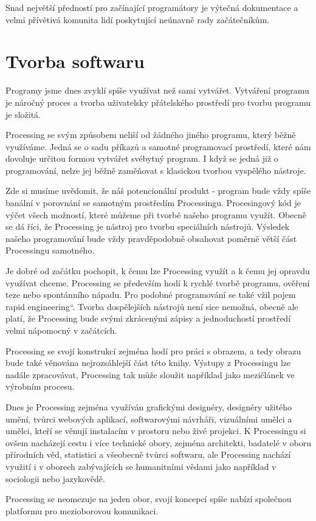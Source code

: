\documentclass[10pt]{book}
\renewcommand\uv[1]{\quotedblbase #1\textquotedblleft}%
\newcommand{\oddil}[1]{\section{#1}\index{#1}\label{#1}}
\begin{document}
Snad největší předností pro začínající programátory je výtečná dokumentace a velmi přívětivá komunita lidí poskytující neúnavně rady začátečníkům.


\oddil{Tvorba softwaru}

Programy jsme dnes zvyklí spíše využívat než sami vytvářet. Vytváření programu je náročný proces a tvorba uživatelsky přátelského prostředí pro tvorbu programu je složitá.

Processing se svým způsobem neliší od žádného jiného programu, který běžně využíváme. Jedná se o sadu příkazů a samotné programovací prostředí, které nám dovoluje určitou formou vytvářet svébytný program. I když se jedná již o programování, nelze jej běžně zaměňovat s klasickou tvorbou vyspělého nástroje.

Zde si musíme uvědomit, že náš potencionální produkt - program bude vždy spíše banální v porovnání se samotným prostředím Processingu. Procesingový kód je výčet všech možností, které můžeme při tvorbě našeho programu využít. Obecně se dá říci, že Processing je nástroj pro tvorbu speciálních nástrojů. Výsledek našeho programování bude vždy pravděpodobně obsahovat poměrně větší část Processingu samotného.

Je dobré od začátku pochopit, k čemu lze Processing využít a k čemu jej opravdu využívat chceme. Processing se především hodí k rychlé tvorbě programu, ověření teze nebo spontánního nápadu. Pro podobné programování se také vžil pojem \uv{rapid engineering}. Tvorba dospělejších nástrojů není sice nemožná, obecně ale platí, že Processing bude svými zkrácenými zápisy a jednoduchostí prostředí velmi nápomocný v začátcích. 

Processing se svojí konstrukcí zejména hodí pro práci s obrazem, a tedy obrazu bude také věnována nejrozsáhlejší část této knihy. Výstupy z Processingu lze nadále zpracovávat, Processing tak může sloužit například jako mezičlánek ve výrobním procesu.

Dnes je Processing zejména využíván grafickými designéry, designéry užitého umění, tvůrci webových aplikací, softwarovými návrháři, vizuálními umělci a umělci, kteří se věnují instalacím v prostoru nebo živé projekci. K Processingu si ovšem nacházejí cestu i více technické obory, zejména architekti, badatelé v oboru přírodních věd, statistici a všeobecně tvůrci softwaru, ale Processing nachází využití i v oborech zabývajících se humanitními vědami jako například v sociologii nebo jazykovědě.

Processing se neomezuje na jeden obor, svojí koncepcí spíše nabízí společnou platformu pro mezioborovou komunikaci.
\end{document}
